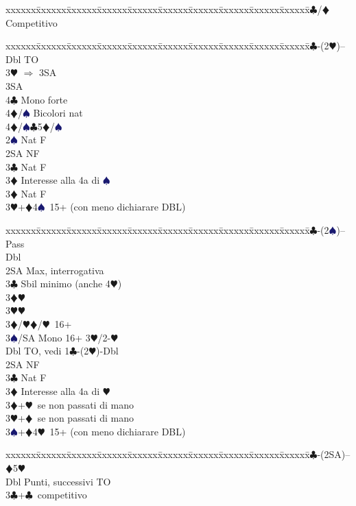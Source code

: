 \documentclass[a4paper,italian]{article}
\newcommand{\BC}{\textcolor{OliveGreen}{$\clubsuit$}}
\newcommand{\BD}{\textcolor{RedOrange}{$\vardiamondsuit$}}
\newcommand{\BH}{\textcolor{Red2}{$\varheartsuit${}}}
\newcommand{\BS}{\textcolor{MidnightBlue}{$\spadesuit${}}}
\newenvironment{bidtable}
{\begin{tabbing}

    xxxxxx\=xxxxxx\=xxxxxx\=xxxxxx\=xxxxxx\=xxxxxx\=xxxxxx\=xxxxxx\=xxxxxx\=xxxxxx\=\kill}
{\end{tabbing} }%
\begin{document}
\begin{multicols}{2}
\begin{bidtable}
        3\BC/\BD \> Competitivo\-
    \end{bidtable}
    \begin{bidtable}
        1\BC-(2\BH)--\+\\
        Dbl \> TO\+\\
        3\BH\> $\Rightarrow$ 3SA\+\\
        3SA\+\\
        4\BC\> Mono forte\\
        4\BD/\BS\> Bicolori nat \-\-\\
        4\BD/\BS{}\BC5\BD/\BS\-\\
        2\BS \> Nat F\\
        2SA \> NF\\
        3\BC \> Nat F\+\\
        3\BD \> Interesse alla 4a di \BS \-\\
        3\BD \> Nat F\\
        3\BH {}+\BD 4\BS\ 15+ (con meno dichiarare DBL)\-
    \end{bidtable}
    \begin{bidtable}
        1\BC-(2\BS)--\+\\
        Pass\+\\
        Dbl\+\\
        2SA\> Max, interrogativa\+\\
        3\BC\> Sbil minimo (anche 4\BH)\+\\
        3\BD{}\BH\\
        3\BH{}\BH\-\\
        3\BD/\BH{}\BD/\BH\ 16+\\
        3\BS/SA\> Mono 16+ 3\BH/2-\BH\-\-\-\\
        Dbl \> TO, vedi 1\BC-(2\BH)-Dbl\\
        2SA \> NF\\
        3\BC \> Nat F\+\\
        3\BD \> Interesse alla 4a di \BH \-\\
        3\BD {}+\BH\ se non passati di mano\\
        3\BH {}+\BD\ se non passati di mano\\
        3\BS {}+\BD 4\BH\ 15+ (con meno dichiarare DBL)\-
    \end{bidtable}
    \begin{bidtable}
        1\BC-(2SA)-- \> \BD 5\BH \+\\
        Dbl \> Punti, successivi TO\\
        3\BC {}+\BC\ competitivo\\

\end{bidtable}
\end{multicols}
\end{document}
